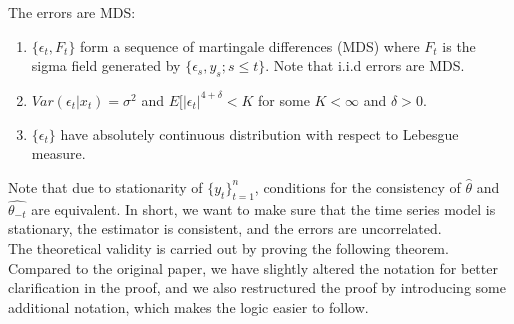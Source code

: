 \documentclass[12pt, oneside]{amsart}
\theoremstyle{definition}
\theoremstyle{remark}
\numberwithin{equation}{section}
\begin{document}
\begin{assumption}\label{assump3}
The errors are MDS: 
\begin{enumerate}
    \item $ \{ \epsilon_t,F_t \}$ form a sequence of martingale differences (MDS) where $F_t$ is the sigma field generated by $ \{ \epsilon_s, y_s;s \leq t \} $. Note that i.i.d errors are MDS.
    \item $Var(\epsilon_t | x_t) = \sigma^2$ and $E[|\epsilon_t|^{4+\delta} < K$ for some $K < \infty$ and $\delta > 0$.
    \item $\{\epsilon_t\}$ have absolutely continuous distribution with respect to Lebesgue measure. 
\end{enumerate}
\end{assumption}

Note that due to stationarity of $\{y_t\}^n_{t=1}$, conditions for the consistency of $\hat{\theta}$ and $\hat{\theta_{-t}}$ are equivalent. In short, we want to make sure that the time series model is stationary, the estimator is consistent, and the errors are uncorrelated.  \\

The theoretical validity is carried out by proving the following theorem. Compared to the original paper, we have slightly altered the notation for better clarification in the proof, and we also restructured the proof by introducing some additional notation, which makes the logic easier to follow.
\end{document}
